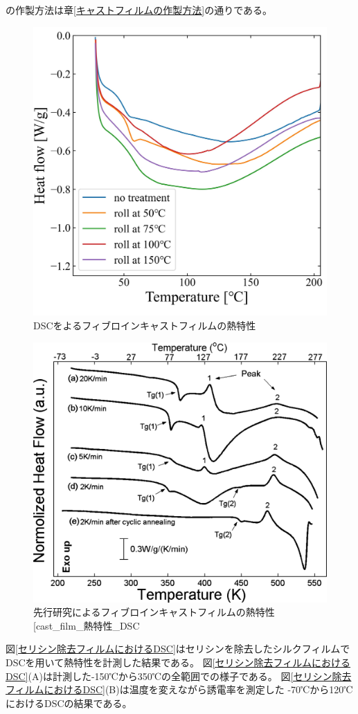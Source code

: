 \documentclass[dvipdfmx,12pt,a4paper]{jreport}
\makeatletter
\DeclareRobustCommand\cite{\unskip
    	\@ifnextchar[{\@tempswatrue\@citex}{\@tempswafalse\@citex[]}}
\makeatother
\begin{document}
		の作製方法は章\ref{キャストフィルムの作製方法}の通りである。
		\begin{figure}[h]
			\centering
			\includegraphics[scale=0.9]{cast_film_DSC_20210621.jpg}
			\caption{DSCをよるフィブロインキャストフィルムの熱特性}
			\label{cast_film_DSC}
		\end{figure}
		\begin{figure}[H]
			\centering
			\includegraphics[scale=1]{DSC_cast_film_report.jpeg}
			\caption{先行研究によるフィブロインキャストフィルムの熱特性\cite{cast_film_熱特性_DSC}}
			\label{cast_film_熱特性_DSC}
		\end{figure}
		\newpage
		図\ref{セリシン除去フィルムにおけるDSC}はセリシンを除去したシルクフィルムでDSCを用いて熱特性を計測した結果である。
		図\ref{セリシン除去フィルムにおけるDSC}(A)は計測した-150℃から350℃の全範囲での様子である。
		図\ref{セリシン除去フィルムにおけるDSC}(B)は温度を変えながら誘電率を測定した
		-70℃から120℃におけるDSCの結果である。
	
\end{document}
